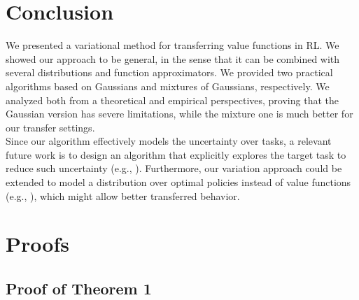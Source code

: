 \documentclass{article}
\begin{document}
\section{Conclusion}

We presented a variational method for transferring value functions in RL. We showed our approach to be general, in the sense that it can be combined with several distributions and function approximators. We provided two practical algorithms based on Gaussians and mixtures of Gaussians, respectively. We analyzed both from a theoretical and empirical perspectives, proving that the Gaussian version has severe limitations, while the mixture one is much better for our transfer settings.\\
Since our algorithm effectively models the uncertainty over tasks, a relevant future work is to design an algorithm that explicitly explores the target task to reduce such uncertainty (e.g., \cite{houthooft2016vime}). Furthermore, our variation approach could be extended to model a distribution over optimal policies instead of value functions (e.g., \cite{liu2017stein}), which might allow better transferred behavior.

{\small 


}

\newpage
\appendix

\section{Proofs}

\subsection{Proof of Theorem 1}\label{app:a1}
\end{document}

